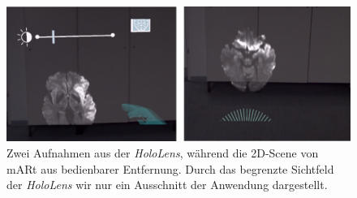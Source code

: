 \begin{figure}[!htb]
	\centering
	\includegraphics[width=0.9\linewidth]{images/mARt_Cutoff.png}
	\caption{Zwei Aufnahmen aus der \textit{HoloLens}, während die 2D-Scene von mARt aus bedienbarer Entfernung. Durch das begrenzte Sichtfeld der \textit{HoloLens} wir nur ein Ausschnitt der Anwendung dargestellt.}
	\label{img:ARCutoff}
\end{figure}
\FloatBarrier

